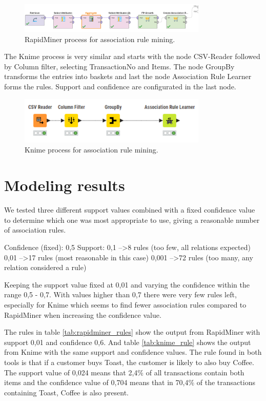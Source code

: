 \begin{figure}[H]
\centering
\includegraphics[width=0.8\textwidth]{figures/AssociationRulesRapidMinerProcess.png}
\caption{RapidMiner process for association rule mining.}
\label{fig:AssociationRulesRapidMinerProcess}
\end{figure}

The Knime process is very similar and starts with the node CSV-Reader followed by Column filter,
selecting TransactionNo and Items. The node GroupBy transforms the entries into baskets and last
the node Association Rule Learner forms the rules. Support and confidence are configurated in the
last node.

\begin{figure}[H]
\centering
\includegraphics[width=0.8\textwidth]{figures/AssociationRulesKnimeProcess.png}
\caption{Knime process for association rule mining.}
\label{fig:KnimeProcess}
\end{figure}

\section{Modeling results}
We tested three different support values combined with a fixed confidence value to determine which
one was most appropriate to use, giving a reasonable number of association rules.

Confidence (fixed): 0,5
Support:
0,1 --\textgreater 8 rules (too few, all relations expected)
0,01 --\textgreater 17 rules (most reasonable in this case)
0,001 --\textgreater 72 rules (too many, any relation considered a rule)

Keeping the support value fixed at 0,01 and varying the confidence within the range 0,5 - 0,7.
With values higher than 0,7 there were very few rules left, especially for Knime which seems to
find fewer association rules compared to RapidMiner when increasing the confidence value.

The rules in table \ref{tab:rapidminer_rules} show the output from RapidMiner with
support 0,01 and confidence 0,6. And table \ref{tab:knime_rule} shows the output from Knime with
the same support and confidence values. The rule found in both tools is that if a customer buys
Toast, the customer is likely to also buy Coffee. The support value of 0,024 means that 2,4\%
of all transactions contain both items and the confidence value of 0,704 means that in 70,4\%
of the transactions containing Toast, Coffee is also present.

